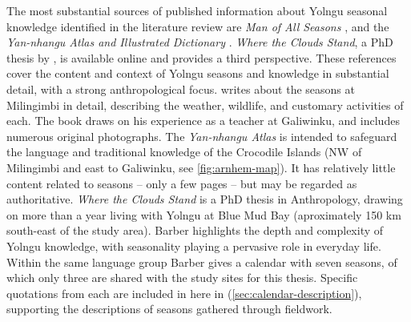 The most substantial sources of published information about Yolngu seasonal
knowledge identified in the literature review are \textit{Man of All Seasons}
\citep{davis1989}, and the \textit{Yan-nhangu Atlas and Illustrated Dictionary}
\citep{atlas2014}.  \textit{Where the Clouds Stand}, a PhD thesis by
\citep{barber2005}, is available online and provides a third perspective.
These references cover the content and context of Yolngu seasons and knowledge
in substantial detail, with a strong anthropological focus.
%
\citet{davis1989} writes about the seasons at Milingimbi in detail,
describing the weather, wildlife, and customary activities of each.  The book
draws on his experience as a teacher at Galiwinku, and includes
numerous original photographs.
%
The \textit{Yan-nhangu Atlas} is intended to safeguard the language and
traditional knowledge of the Crocodile Islands (NW of Milingimbi and east
to Galiwinku, see \cref{fig:arnhem-map}).  It has relatively little content
related to seasons -- only a few pages -- but may be regarded as authoritative.
%
\textit{Where the Clouds Stand} is a PhD thesis in Anthropology, drawing on
more than a year living with Yolngu at Blue Mud Bay (aproximately 150 km
south-east of the study area).  Barber highlights the depth and complexity
of Yolngu knowledge, with seasonality playing a pervasive role in everyday
life.  Within the same language group Barber gives a calendar with
seven seasons, of which only three are shared with the study sites for this
thesis.
%
Specific quotations from each are included in here in \textit{}
(\cref{sec:calendar-description}), supporting the descriptions of seasons
gathered through fieldwork.

